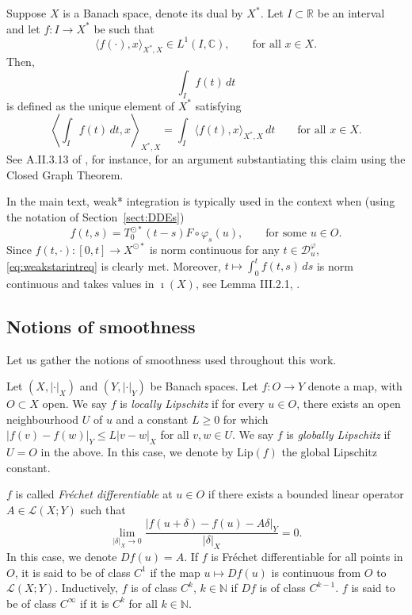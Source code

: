 \documentclass[a4paper, 12pt, oneside, reqno, notitlepage]{amsart}
\theoremstyle{plain}
\theoremstyle{definition}
\theoremstyle{remark}
\newcommand{\lip}{\mathrm{Lip}}
\begin{document}
Suppose $X$ is a Banach space, denote its dual by $X^*$.
Let $I \subset \mathbb{R}$ be an interval and let $f: I \to X^{ *}$ be such that
\begin{equation}
    \langle f( \cdot ),x\rangle_{X^{ *},X } \in L^1(I,\mathbb{C}), \qquad \text{for all } x \in X.
    \label{eq:weakstarintreq}
\end{equation}
Then,
\begin{displaymath}
    \int_I f(t) \,dt
\end{displaymath}
is defined as the unique element of $X^{ *}$ satisfying
\begin{displaymath}
    \left\langle \int_I f(t) \,dt,x \right\rangle_{X^{ *},X} = \int_I \langle f(t),x\rangle_{X^{ *},X} \, dt  \qquad \text{for all } x \in X.
\end{displaymath}
See A.II.3.13 of \cite{diekmann2012delay}, for instance, for an argument substantiating this claim using the Closed Graph Theorem.

In the main text, weak* integration is typically used in the context when (using the notation of Section~\ref{sect:DDEs})
\begin{displaymath}
    f(t,s) = T_0^{\odot *}(t-s) F \circ \varphi_s(u), \qquad \text{for some } u \in O.
\end{displaymath}
Since $f(t,\cdot):[0,t] \to X^{\odot *}$ is norm continuous for any $t \in \mathcal{D}^\varphi_u$, \eqref{eq:weakstarintreq} is clearly met.
Moreover, $t \mapsto \int_0^tf(t,s) \, ds$ is norm continuous and takes values in $\imath(X)$, see Lemma III.2.1, \cite{diekmann2012delay}.


\subsection{Notions of smoothness}
\label{sect:notions_of_smoothness}

Let us gather the notions of smoothness used throughout this work.

Let $(X,|\cdot|_X)$ and $(Y,|\cdot|_Y)$ be Banach spaces.
Let $f : O \to Y$ denote a map, with $O \subset X$ open.
We say $f$ is \textit{locally Lipschitz} if for every $u \in O$, there exists an open neighbourhood $U$ of $u$ and a constant $L \geq 0$ for which $|f(v)-f(w)|_Y \leq L |v-w|_X$ for all $v,w \in U$.
We say $f$ is \textit{globally Lipschitz} if $U = O$ in the above.
In this case, we denote by $\lip(f)$ the global Lipschitz constant.

$f$ is called \textit{Fréchet differentiable} at $u \in O$ if there exists a bounded linear operator $A \in \mathcal{L}(X;Y)$ such that
\begin{displaymath}
    \lim_{|\delta|_X \to 0} \frac{| f(u+\delta)-f(u)-A\delta|_Y}{|\delta|_X} = 0.
\end{displaymath}
In this case, we denote $Df(u) = A$.
If $f$ is Fréchet differentiable for all points in $O$, it is said to be of class $C^1$ if the map $u \mapsto Df(u)$ is continuous from $O $ to $\mathcal{L}(X;Y)$.
Inductively, $f$ is of class $C^k$, $k \in \mathbb{N}$ if $Df$ is of class $C^{k-1}$.
$f$ is said to be of class $C^\infty$ if it is $C^k$ for all $k \in \mathbb{N}$.
\end{document}
